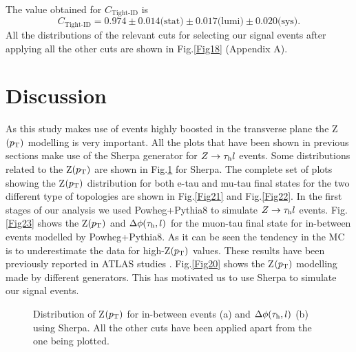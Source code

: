 The value obtained for $C_{\text{Tight-ID}}$ is
\begin{equation}
C_{\text{Tight-ID}}=0.974\pm 0.014\text{(stat)}\pm 0.017\text{(lumi)}\pm 0.020\text{(sys)}.
\end{equation}
All the distributions of the relevant cuts for selecting our signal events after applying all the other cuts are shown in Fig.\ref{Fig18} (Appendix A).
\section{Discussion}
As this study makes use of events highly boosted in the transverse plane the Z$(p_\text{T})$ modelling is very important. All the plots that have been shown in previous sections make use of the Sherpa generator for $Z\to\tau_\text{h} l$ events. Some distributions related to the Z$(p_\text{T})$ are shown in Fig.\ref{Fig19} for Sherpa. The complete set of plots showing the Z$(p_\text{T})$ distribution for both e-tau and mu-tau final states for the two different type of topologies are shown in Fig.\ref{Fig21} and Fig.\ref{Fig22}. In the first stages of our analysis we used Powheg+Pythia8 to simulate $Z\to\tau_\text{h} l$ events. Fig.\ref{Fig23} shows the Z$(p_\text{T})$ and $\Delta\phi(\tau_\text{h},l)$ for the muon-tau final state for in-between events modelled by Powheg+Pythia8. As it can be seen the tendency in the MC is to underestimate the data for high-Z$(p_\text{T})$ values. These results have been previously reported in ATLAS studies \cite{Aad:2019wmn}. Fig.\ref{Fig20} shows the Z$(p_\text{T})$ modelling made by different generators. This has motivated us to use Sherpa to simulate our signal events.
\begin{figure}[H]
	\centering
	\hfill
	\caption{Distribution of Z$(p_\text{T})$ for in-between events (a) and $\Delta\phi(\tau_\text{h},l)$ (b) using Sherpa. All the other cuts have been applied apart from the one being plotted.}
	\label{Fig19}
\end{figure}
